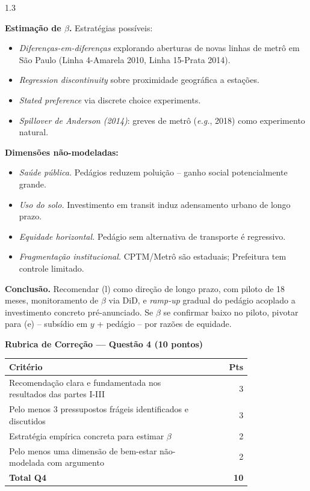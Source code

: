 \documentclass[11pt,addpoints]{exam}
\begin{document}
\begin{spacing}{1.3}
\begin{questions}
\begin{solution}
\textbf{Estimação de $\beta$.} Estratégias possíveis:
\begin{itemize}[noitemsep]
\item \textit{Diferenças-em-diferenças} explorando aberturas de novas linhas de metrô em São Paulo (Linha 4-Amarela 2010, Linha 15-Prata 2014).
\item \textit{Regression discontinuity} sobre proximidade geográfica a estações.
\item \textit{Stated preference} via discrete choice experiments.
\item \textit{Spillover de Anderson (2014)}: greves de metrô (\textit{e.g.}, 2018) como experimento natural.
\end{itemize}

\textbf{Dimensões não-modeladas:}
\begin{itemize}[noitemsep]
\item \textit{Saúde pública.} Pedágios reduzem poluição -- ganho social potencialmente grande.
\item \textit{Uso do solo.} Investimento em transit induz adensamento urbano de longo prazo.
\item \textit{Equidade horizontal.} Pedágio sem alternativa de transporte é regressivo.
\item \textit{Fragmentação institucional.} CPTM/Metrô são estaduais; Prefeitura tem controle limitado.
\end{itemize}

\textbf{Conclusão.} Recomendar (l) como direção de longo prazo, com piloto de 18 meses, monitoramento de $\beta$ via DiD, e \textit{ramp-up} gradual do pedágio acoplado a investimento concreto pré-anunciado. Se $\beta$ se confirmar baixo no piloto, pivotar para (e) -- subsídio em $y$ + pedágio -- por razões de equidade.
\end{solution}

\ifprintanswers
\vspace{1em}
{\color{rubred}
\noindent\textbf{Rubrica de Correção --- Questão 4 (10 pontos)}
\vspace{0.3em}

\noindent\small
\begin{tabular}{@{}p{0.80\linewidth} r@{}}
\toprule
\textbf{Critério} & \textbf{Pts} \\
\midrule
Recomendação clara e fundamentada nos resultados das partes I-III & 3 \\
Pelo menos 3 pressupostos frágeis identificados e discutidos & 3 \\
Estratégia empírica concreta para estimar $\beta$ & 2 \\
Pelo menos uma dimensão de bem-estar não-modelada com argumento & 2 \\
\midrule
\textbf{Total Q4} & \textbf{10} \\
\bottomrule
\end{tabular}\normalsize
}
\fi

\end{questions}
\end{spacing}
\end{document}
